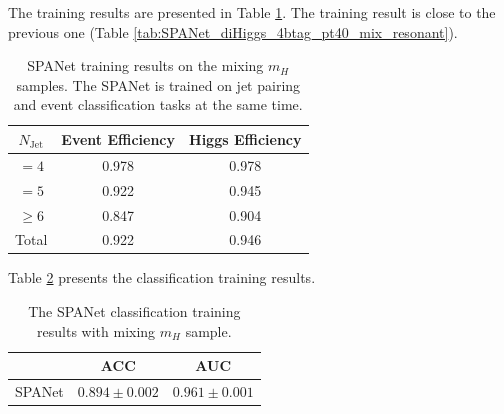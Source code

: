 \documentclass[12pt]{article}
\begin{document}
		The training results are presented in Table \ref{tab:SPANet_diHiggs_4btag_pt40_mix_resonant_cls}. The training result is close to the previous one (Table \ref{tab:SPANet_diHiggs_4btag_pt40_mix_resonant}).
		\begin{table}[htpb]
			\centering
			\caption{SPANet training results on the mixing $m_H$ samples. The SPANet is trained on jet pairing and event classification tasks at the same time.}
			\label{tab:SPANet_diHiggs_4btag_pt40_mix_resonant_cls}
			\begin{tabular}{c|cc}
				$N_\text{Jet}$ & Event Efficiency & Higgs Efficiency \\
				\hline
				$=4$	  &      0.978              &    0.978             \\
				$=5$	  &      0.922              &    0.945             \\
				$\ge 6$	  &      0.847              &    0.904             \\
				\hline
				Total	  &      0.922              &    0.946             \\
			\end{tabular}
		\end{table}

		Table \ref{tab:res_SPANET_cls_results} presents the classification training results.
		\begin{table}[htpb]
			\centering
			\caption{The SPANet classification training results with mixing $m_H$ sample.}
			\label{tab:res_SPANET_cls_results}
			\begin{tabular}{c|cc}
			& ACC     & AUC   \\ \hline
			 SPANet & $0.894 \pm 0.002$ & $0.961 \pm 0.001$
			\end{tabular}      
		\end{table}
\end{document}

